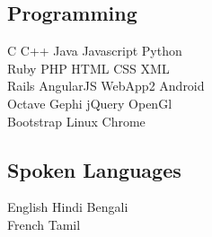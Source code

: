 \documentclass[]{deedy-resume-openfont}
\begin{document}
\begin{minipage}[t]{0.33\textwidth}
\subsection{Programming}
C \textbullet{}   C++ \textbullet{} Java \textbullet{} Javascript \textbullet{} Python \\
Ruby \textbullet{} PHP \textbullet{} HTML \textbullet{} CSS \textbullet{} XML \\
Rails \textbullet{} AngularJS \textbullet{} WebApp2 \textbullet{} Android  \\
Octave \textbullet{} Gephi \textbullet{} jQuery \textbullet{} OpenGl \\
Bootstrap \textbullet{} Linux \textbullet{} Chrome 
\sectionsep

\subsection{Spoken Languages}
English \textbullet{} Hindi \textbullet{} Bengali \\
French \textbullet{} Tamil

%
%

\end{minipage} 
\hfill
\end{document}
